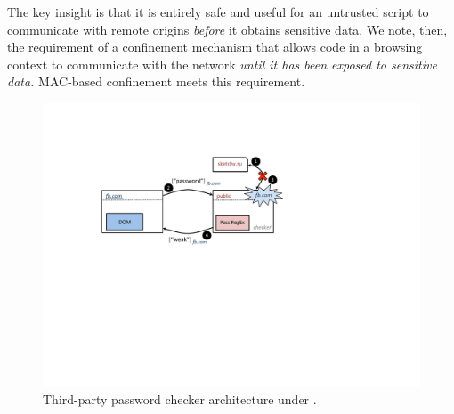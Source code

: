 The key insight is that it is entirely safe and useful for an untrusted script to
communicate with remote origins {\em before} it obtains sensitive
data. We note, then, the requirement of a confinement mechanism that
allows code in a browsing context to communicate with the network {\em
  until it has been exposed to sensitive data.} MAC-based confinement
meets this requirement.

\begin{figure}
\centerline{\includegraphics[width=\columnwidth]{checker}}
\caption{\label{fig:checker} Third-party password checker architecture
under \sys{}.}
\end{figure}

